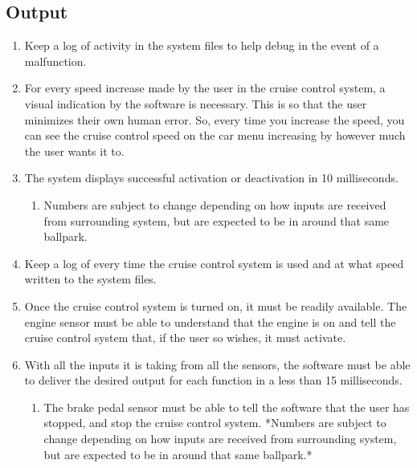 \documentclass[preprint,11pt,3p]{article}
\begin{document}
\subsection{Output}
\begin{enumerate}
	\item Keep a log of activity in the system files to help debug in the event of a malfunction.
	\item For every speed increase made by the user in the cruise control system, a visual indication by the software is necessary. This is so that the user minimizes their own human error. So, every time you increase the speed, you can see the cruise control speed on the car menu increasing by however much the user wants it to.
	\item The system displays successful activation or deactivation in 10 milliseconds. 
		\begin{enumerate}
			\item Numbers are subject to change depending on how inputs are received from surrounding system, but are expected to be in around that same ballpark.
		\end{enumerate}
	\item Keep a log of every time the cruise control system is used and at what speed written to the system files.
	\item Once the cruise control system is turned on, it must be readily available. The engine sensor must be able to understand that the engine is on and tell the cruise control system that, if the user so wishes, it must activate. 
	\item With all the inputs it is taking from all the sensors, the software must be able to deliver the desired output for each function in a less than 15 milliseconds. 
		\begin{enumerate}
			\item The brake pedal sensor must be able to tell the software that the user has stopped, and stop the cruise control system. *Numbers are subject to change depending on how inputs are received from surrounding system, but are expected to be in around that same ballpark.*
		\end{enumerate}
\end{enumerate}
\end{document}
